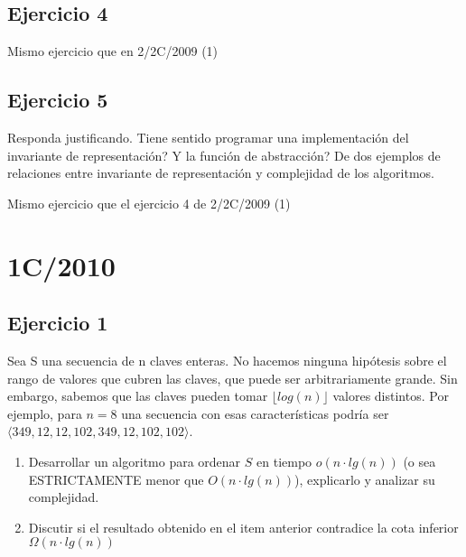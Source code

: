 \documentclass[10pt, a4paper]{article}
\begin{document}
\subsection*{Ejercicio 4}

Mismo ejercicio que en 2/2C/2009 (1)

\subsection*{Ejercicio 5}

Responda justificando.
Tiene sentido programar una implementaci\'on del invariante de representaci\'on?
Y la funci\'on de abstracci\'on?
De dos ejemplos de relaciones entre invariante de representaci\'on y complejidad de los algoritmos.

Mismo ejercicio que el ejercicio 4 de 2/2C/2009 (1)

\newpage
\section{1C/2010}

\subsection*{Ejercicio 1}

Sea S una secuencia de n claves enteras. No hacemos ninguna hip\'otesis sobre el rango de valores que cubren las claves, que puede ser arbitrariamente grande. Sin embargo, sabemos que las claves pueden tomar $\lfloor log(n) \rfloor$ valores distintos. Por ejemplo, para $n=8$ una secuencia con esas caracter\'isticas podr\'ia ser $\langle349, 12, 12, 102, 349, 12, 102, 102\rangle$.

\begin{enumerate}
 \item Desarrollar un algoritmo para ordenar $S$ en tiempo $o(n\cdot lg(n))$ (o sea ESTRICTAMENTE menor que $O(n\cdot lg(n))$), explicarlo y analizar su complejidad.
 \item Discutir si el resultado obtenido en el item anterior contradice la cota inferior $\Omega(n\cdot lg(n))$
\end{enumerate}
\end{document}
